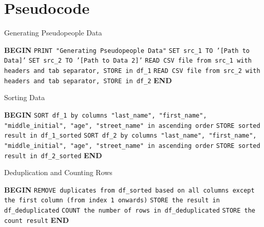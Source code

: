 \documentclass{article}
\begin{document}
\section*{Pseudocode}

\begin{algorithm}
\caption{Generating Pseudopeople Data}
\begin{algorithmic}[1]
\State \textbf{BEGIN}
\State \hspace{1cm} \texttt{PRINT "Generating Pseudopeople Data"}
\State \hspace{1cm} \texttt{SET src\_1 TO '[Path to Data]'} 
\State \hspace{1cm} \texttt{SET src\_2 TO '[Path to Data 2]'} 
\State \hspace{1cm} \texttt{READ CSV file from src\_1 with headers and tab separator, STORE in df\_1}
\State \hspace{1cm} \texttt{READ CSV file from src\_2 with headers and tab separator, STORE in df\_2}
\State \textbf{END}
\end{algorithmic}
\end{algorithm}

\begin{algorithm}
\caption{Sorting Data}
\begin{algorithmic}[1]
\State \textbf{BEGIN}
\State \hspace{1cm} \texttt{SORT df\_1 by columns "last\_name", "first\_name", "middle\_initial", "age", "street\_name" in ascending order}
\State \hspace{1cm} \texttt{STORE sorted result in df\_1\_sorted}
\State \hspace{1cm} \texttt{SORT df\_2 by columns "last\_name", "first\_name", "middle\_initial", "age", "street\_name" in ascending order}
\State \hspace{1cm} \texttt{STORE sorted result in df\_2\_sorted}
\State \textbf{END}
\end{algorithmic}
\end{algorithm}

\begin{algorithm}
\caption{Deduplication and Counting Rows}
\begin{algorithmic}[1]
\State \textbf{BEGIN}
\State \hspace{1cm} \texttt{REMOVE duplicates from df\_sorted based on all columns except the first column (from index 1 onwards)}
\State \hspace{1cm} \texttt{STORE the result in df\_deduplicated}
\State \hspace{1cm} \texttt{COUNT the number of rows in df\_deduplicated}
\State \hspace{1cm} \texttt{STORE the count result}
\State \textbf{END}
\end{algorithmic}
\end{algorithm}
\end{document}
